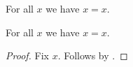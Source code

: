 \begin{axiom}\label{phase7_concurrent_earlier_axiom}
    For all $x$ we have $x = x$.
\end{axiom}

\begin{proposition}\label{phase7_concurrent_earlier_failure}
    For all $x$ we have $x = x$.
\end{proposition}
\begin{proof}
    Fix $x$.
    Follows by \auto.
\end{proof}
